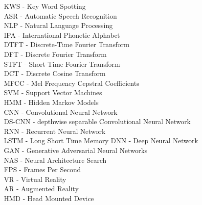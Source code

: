 
KWS - Key Word Spotting\\
ASR - Automatic Speech Recognition\\
NLP - Natural Language Processing\\
IPA - International Phonetic Alphabet\\
%
DTFT - Discrete-Time Fourier Transform\\
DFT - Discrete Fourier Transform\\
STFT - Short-Time Fourier Transform\\
DCT - Discrete Cosine Transform\\
MFCC - Mel Frequency Cepstral Coefficients\\
%
SVM - Support Vector Machines\\
HMM - Hidden Markov Models\\
%
CNN - Convolutional Neural Network\\
DS-CNN - depthwise separable Convolutional Neural Network\\
RNN - Recurrent Neural Network\\
LSTM - Long Short Time Memory
DNN - Deep Neural Network\\
GAN - Generative Adversarial Neural Networks\\
NAS - Neural Architecture Search\\
%
FPS - Frames Per Second\\
VR - Virtual Reality\\
AR - Augmented Reality\\
HMD - Head Mounted Device\\
